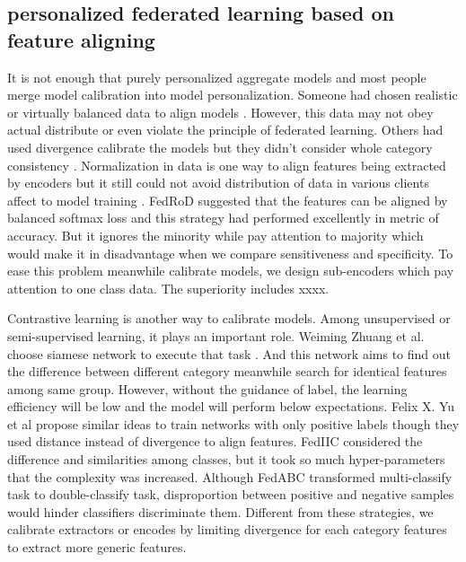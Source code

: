 \documentclass[journal]{IEEEtran}
\begin{document}
\subsection{personalized federated learning based on feature aligning}
It is not enough that purely personalized aggregate models and most people merge model calibration into model personalization. Someone had chosen realistic or virtually balanced data to align models \cite{Luo2021NoFO,Shang2022FEDICFL,Zhao2018FederatedLW}. However, this data may not obey actual distribute or even violate the principle of federated learning. Others had used divergence calibrate the models but they didn't consider whole category consistency \cite{Li2022RobustAF,Zhang2021FederatedLF}. Normalization in data is one way to align features being extracted by encoders but it still could not avoid distribution of data in various clients affect to model training \cite{Li2021FedBNFL}.  FedRoD\cite{Chen2022OnBG} suggested that the features can be aligned by balanced softmax loss and this strategy had performed excellently in metric of accuracy. But it ignores the minority while pay attention to majority which would make it in disadvantage when we compare sensitiveness and specificity. To ease this problem meanwhile calibrate models, we design sub-encoders which pay attention to one class data.  The superiority includes xxxx.

Contrastive learning is another way to calibrate models. Among unsupervised or semi-supervised learning, it plays an important role. Weiming Zhuang et al.  choose siamese network to execute that task \cite{Zhuang2022DivergenceawareFS}. And this network aims to find out the difference between different category meanwhile search for identical features among same group. However, without the guidance of label, the learning efficiency will be low and the model will perform below expectations. Felix X. Yu et al\cite{Yu2020FederatedLW} propose similar ideas to train networks with only positive labels though they used distance instead of divergence to align features. FedIIC\cite{Wu2022FedIICTR} considered the difference and similarities among classes, but it took so much hyper-parameters that the complexity was increased. Although FedABC\cite{Wang2023FedABCTF} transformed multi-classify task to double-classify task, disproportion between positive and negative samples would hinder classifiers discriminate them. Different from these strategies, we calibrate extractors or encodes by limiting divergence for each category features to extract more generic features.  
\end{document}
